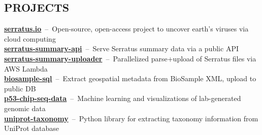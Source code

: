\documentclass[line,resmargin]{res}
\begin{document}
\begin{resume}
\section{PROJECTS}
    \textbf{\href{https://serratus.io/}{serratus.io}}~--~Open-source, open-access project to uncover earth's viruses via cloud computing \\
    \textbf{\href{https://github.com/serratus-bio/serratus-summary-api}{serratus-summary-api}}~--~Serve Serratus summary data via a public API \\
    \textbf{\href{https://github.com/serratus-bio/serratus-summary-uploader}{serratus-summary-uploader}}~--~Parallelized parse+upload of Serratus files via AWS Lambda \\
    \textbf{\href{https://github.com/serratus-bio/biosample-sql}{biosample-sql}}~--~Extract geospatial metadata from BioSample XML, upload to public DB \\
    \textbf{\href{https://github.com/zhoulab/p53-chip-seq-data}{p53-chip-seq-data}}~--~Machine learning and visualizations of lab-generated genomic data \\
    \textbf{\href{https://github.com/zhoulab/uniprot-taxonomy}{uniprot-taxonomy}}~--~Python library for extracting taxonomy information from UniProt database \\



\end{resume}
\end{document}
